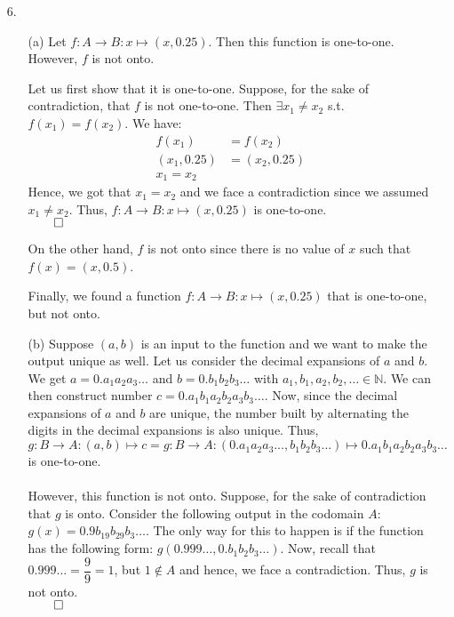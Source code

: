 \documentclass[11pt]{article}
\newcommand{\nats}{\mathbb{N}}
\begin{document}
\begin{itemize}
        \newpage
        \item[6.]
            \begin{itemize}
                \item[(a)]
                    Let $f : A \to B : x \mapsto (x, 0.25)$. Then this function
                    is one-to-one. However, $f$ is not onto.

                    Let us first show that it is one-to-one. Suppose, for the
                    sake of contradiction, that $f$ is not one-to-one. Then
                    $\exists x_1 \neq x_2$ s.t. $f(x_1) = f(x_2)$. We have:
                    \begin{align*}
                        f(x_1)      &= f(x_2)\\
                        (x_1, 0.25) &= (x_2, 0.25)\\
                        x_1 = x_2
                    \end{align*}
                    Hence, we got that $x_1 = x_2$ and we face a contradiction
                    since we assumed $x_1 \neq x_2$. Thus, $f : A \to B : x
                    \mapsto (x, 0.25)$ is one-to-one.\\
                    $\qed$

                    On the other hand, $f$ is not onto since there is no value
                    of $x$ such that $f(x) = (x, 0.5)$.

                    Finally, we found a function $f : A \to B : x \mapsto (x,
                    0.25)$ that is one-to-one, but not onto.

                \item[(b)]
                    Suppose $(a, b)$ is an input to the function and we want to
                    make the output unique as well. Let us consider the decimal
                    expansions of $a$ and $b$. We get $a = 0.a_1a_2a_3\dots$
                    and $b = 0.b_1b_2b_3\dots$ with $a_1, b_1, a_2, b_2, \dots
                    \in \nats$. We can then construct number $c =
                    0.a_1b_1a_2b_2a_3b_3\dots$. Now, since the decimal
                    expansions of $a$ and $b$ are unique, the number built by
                    alternating the digits in the decimal expansions is also
                    unique. Thus, $g : B \to A : (a, b) \mapsto c = g : B \to A
                    : (0.a_1a_2a_3\dots, b_1b_2b_3\dots) \mapsto
                    0.a_1b_1a_2b_2a_3b_3\dots$ is one-to-one.
                    \\
                    \\
                    However, this function is not onto. Suppose, for the sake
                    of contradiction that $g$ is onto. Consider the following
                    output in the codomain $A$: $g(x) = 0.9b_19b_29b_3\dots$.
                    The only way for this to happen is if the function has the
                    following form: $g(0.999\dots, 0.b_1b_2b_3\dots)$. Now,
                    recall that $0.999\dots = \dfrac{9}{9} = 1$, but $1 \notin
                    A$ and hence, we face a contradiction. Thus, $g$ is not
                    onto.\\
                    $\qed$


\end{itemize}
\end{itemize}
\end{document}
